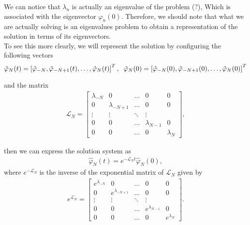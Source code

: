 	We can notice that $\lambda_n$ is actually an eigenvalue of the problem (?), Which is associated with the eigenvector $\varphi_n (0)$. Therefore, we should note that what we are actually solving is an eigenvalues ​​problem to obtain a representation of the solution in terms of its eigenvectors. \\
	
	To see this more clearly, we will represent the solution by configuring the following vectors
	\begin{align*}
		\hat{\varphi}_N (t) = \left[ \hat{\varphi}_{-N} , \hat{\varphi}_{-N + 1} (t), \dots, \hat{\varphi}_N (t)  \right]^T, \hspace{2mm} \hat{\varphi}_N (0) = \left[ \hat{\varphi}_{-N} (0) , \hat{\varphi}_{-N + 1} (0), \dots, \hat{\varphi}_N (0)  \right]^T
	\end{align*}
	
	\noindent and the matrix 
	\begin{align*}
		\displaystyle \mathcal{L}_N = {\begin{bmatrix}
				\lambda_{-N} & 0 & \ldots & 0 & 0\\
				0 & \lambda_{-N + 1} & \ldots & 0 & 0\\
				\vdots & \vdots & \ddots & \vdots \\
				0 & 0 & \ldots & \lambda_{N - 1} & 0\\
				0 & 0 & \ldots & 0 & \lambda_{N}
		\end{bmatrix}},
	\end{align*}
	
	\noindent then we can express the solution system as 
	\begin{align*}
		\hat{\varphi}_N (t) =  e^{- \mathcal{L}_N t} \hat{\varphi}_N (0), 
	\end{align*}
	where $e^{- \mathcal{L}_N}$ is the inverse of the exponential matrix of $\mathcal{L}_N$ given by 
	\begin{align*}
		\displaystyle e^{\mathcal{L}_N} = {\begin{bmatrix}
				e^{\lambda_{-N}} & 0 & \ldots & 0 & 0\\
				0 & e^{\lambda_{-N + 1}} & \ldots & 0 & 0\\
				\vdots & \vdots & \ddots & \vdots \\
				0 & 0 & \ldots & e^{ \lambda_{N - 1}} & 0\\
				0 & 0 & \ldots & 0 & e^{\lambda_{N}}
		\end{bmatrix}}.
	\end{align*}
	
